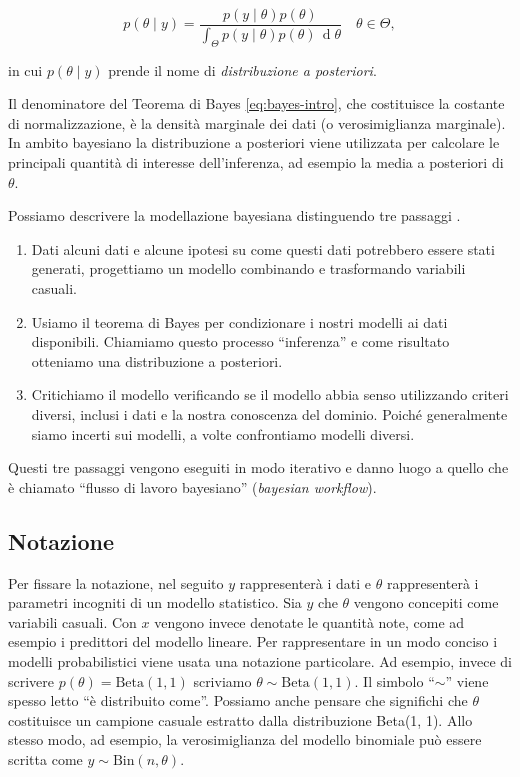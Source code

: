 \documentclass[
  11pt,
]{krantz}
\providecommand{\tightlist}{%
  \setlength{\itemsep}{0pt}\setlength{\parskip}{0pt}}
\theoremstyle{definition}
\theoremstyle{definition}
\theoremstyle{definition}
\theoremstyle{definition}
\theoremstyle{remark}
\begin{document}
\begin{equation}
p(\theta \mid y) = \frac{p(y \mid \theta) p(\theta)}{\int_{\Theta}p(y \mid \theta) p(\theta) \,\operatorname {d}\!\theta} \quad \theta \in \Theta,
 \label{eq:bayes-intro}
\end{equation}

in cui \(p(\theta \mid y)\) prende il nome di \emph{distribuzione a posteriori}.

Il denominatore del Teorema di Bayes \eqref{eq:bayes-intro}, che costituisce la costante di normalizzazione, è la densità marginale dei dati (o verosimiglianza marginale). In ambito bayesiano la distribuzione a posteriori viene utilizzata per calcolare le principali quantità di interesse dell'inferenza, ad esempio la media a posteriori di \(\theta\).

Possiamo descrivere la modellazione bayesiana distinguendo tre passaggi \citep{martin2022bayesian}.

\begin{enumerate}
\def\labelenumi{\arabic{enumi}.}
\tightlist
\item
  Dati alcuni dati e alcune ipotesi su come questi dati potrebbero essere stati generati, progettiamo un modello combinando e trasformando variabili casuali.
\item
  Usiamo il teorema di Bayes per condizionare i nostri modelli ai dati disponibili. Chiamiamo questo processo ``inferenza'' e come risultato otteniamo una distribuzione a posteriori.
\item
  Critichiamo il modello verificando se il modello abbia senso utilizzando criteri diversi, inclusi i dati e la nostra conoscenza del dominio. Poiché generalmente siamo incerti sui modelli, a volte confrontiamo modelli diversi.
\end{enumerate}

Questi tre passaggi vengono eseguiti in modo iterativo e danno luogo a quello che è chiamato ``flusso di lavoro bayesiano'' (\emph{bayesian workflow}).

\hypertarget{notazione}{%
\subsection{Notazione}\label{notazione}}

Per fissare la notazione, nel seguito \(y\) rappresenterà i dati e \(\theta\) rappresenterà i parametri incogniti di un modello statistico. Sia \(y\) che \(\theta\) vengono concepiti come variabili casuali. Con \(x\) vengono invece denotate le quantità note, come ad esempio i predittori del modello lineare. Per rappresentare in un modo conciso i modelli probabilistici viene usata una notazione particolare. Ad esempio, invece di scrivere \(p(\theta) = \mbox{Beta}(1, 1)\) scriviamo \(\theta \sim \mbox{Beta}(1, 1)\). Il simbolo ``\(\sim\)'' viene spesso letto ``è distribuito come''. Possiamo anche pensare che significhi che \(\theta\) costituisce un campione casuale estratto dalla distribuzione Beta(1, 1). Allo stesso modo, ad esempio, la verosimiglianza del modello binomiale può essere scritta come \(y \sim \text{Bin}(n, \theta)\).
\end{document}
